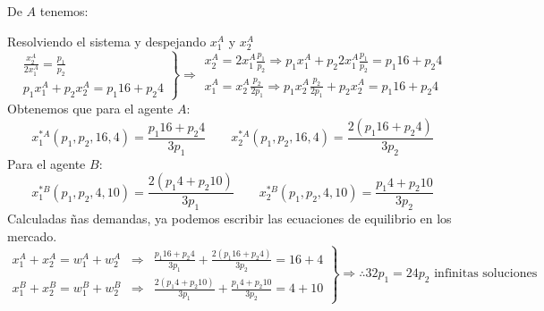 De $A$ tenemos:

Resolviendo el sistema y despejando $x_{1}^{A}$ y $x_{2}^{A}$
	$$\left.
		\begin{array}{c}
			\frac{x_{2}^{A}}{2x_{1}^{A}} = \frac{p_1}{p_2} \\[.5cm]
			p_{1}x_{1}^{A}+p_{2}x_{2}^{A} = p_{1}16 + p_{2}4
		\end{array}
	  \right\} \Longrightarrow 
		\begin{array}{c}
			x_{2}^{A} = 2x_{1}^{A}\frac{p_1}{p_2} \Longrightarrow p_{1}x_{1}^{A}+p_{2}2x_{1}^{A}\frac{p_1}{p_2} = p_{1}16 + p_{2}4\\[.5cm]
			x_{1}^{A} =  x_{2}^{A}\frac{p_2}{2p_1} \Longrightarrow p_{1}x_{2}^{A}\frac{p_2}{2p_1}+p_{2}x_{2}^{A} = p_{1}16 + p_{2}4
		\end{array}$$
Obtenemos que para el agente $A$:
	$$x_{1}^{*A}\left(p_1, p_2, 16, 4 \right) = \frac{p_{1}16 + p_{2}4}{3p_1} \qquad x_{2}^{*A}\left(p_1, p_2, 16, 4 \right) = \frac{2\left( p_{1}16 + p_{2}4\right) }{3p_2}$$
Para el agente $B$:
	$$x_{1}^{*B}\left(p_1, p_2, 4, 10 \right) = \frac{2\left(p_{1}4 + p_{2}10\right)}{3p_1} \qquad x_{2}^{*B}\left(p_1, p_2, 4, 10 \right) = \frac{ p_{1}4 + p_{2}10 }{3p_2}$$
Calculadas ñas demandas, ya podemos escribir las ecuaciones de equilibrio en los mercado.
	$$\left. \begin{array}{ccc}
		x_{1}^{A} + x_{2}^{A} = w_{1}^{A} + w_{2}^{A} & \Longrightarrow &\frac{p_{1}16 + p_{2}4}{3p_1} + \frac{2\left( p_{1}16 + p_{2}4\right) }{3p_2} = 16 + 4 \\[.5cm]
		x_{1}^{B} + x_{2}^{B} = w_{1}^{B} + w_{2}^{B} & \Longrightarrow & \frac{2\left(p_{1}4 + p_{2}10\right)}{3p_1} + \frac{ p_{1}4 + p_{2}10 }{3p_2} = 4 + 10
	  \end{array}\right\} \Longrightarrow \therefore 32p_1 = 24p_2 \text{ infinitas soluciones}$$
